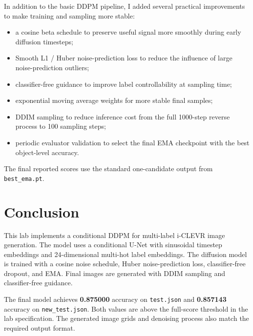 \documentclass[12pt,a4paper]{article}
\begin{document}
In addition to the basic DDPM pipeline, I added several practical improvements
to make training and sampling more stable:
\begin{itemize}
    \item a cosine beta schedule to preserve useful signal more smoothly during
          early diffusion timesteps;
    \item Smooth L1 / Huber noise-prediction loss to reduce the influence of
          large noise-prediction outliers;
    \item classifier-free guidance to improve label controllability at
          sampling time;
    \item exponential moving average weights for more stable final samples;
    \item DDIM sampling to reduce inference cost from the full 1000-step
          reverse process to 100 sampling steps;
    \item periodic evaluator validation to select the final EMA checkpoint with
          the best object-level accuracy.
\end{itemize}
The final reported scores use the standard one-candidate output from
\texttt{best\_ema.pt}.

\newpage

\section{Conclusion}

This lab implements a conditional DDPM for multi-label i-CLEVR image
generation.  The model uses a conditional U-Net with sinusoidal timestep
embeddings and 24-dimensional multi-hot label embeddings.  The diffusion model
is trained with a cosine noise schedule, Huber noise-prediction loss,
classifier-free dropout, and EMA.  Final images are generated with DDIM
sampling and classifier-free guidance.

The final model achieves
\textcolor{red!70!black}{\textbf{0.875000}} accuracy on \texttt{test.json} and
\textcolor{red!70!black}{\textbf{0.857143}} accuracy on
\texttt{new\_test.json}.  Both values are above the full-score threshold in the
lab specification.  The generated image grids and denoising process also match
the required output format.
\end{document}
